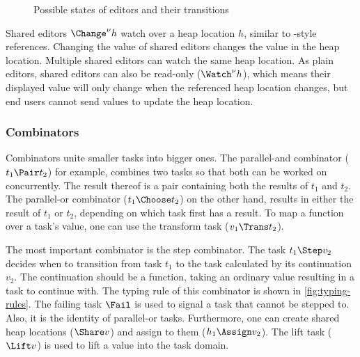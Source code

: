 \begin{figure}
  
  \caption{Possible states of editors and their transitions}
  \label{fig:editor-state}
\end{figure}

Shared editors $\Change^\nu h$ watch over a heap location $h$,
similar to \ML-style references.
Changing the value of shared editors changes the value in the heap location.
Multiple shared editors can watch the same heap location.
As plain editors, shared editors can also be read-only ($\Watch^\nu h$),
which means their displayed value will only change when the referenced heap location changes,
but end users cannot send values to update the heap location.


\subsubsection{Combinators}

Combinators unite smaller tasks into bigger ones.
The parallel-and combinator ($t_1 \Pair t_2$) for example,
combines two tasks so that both can be worked on concurrently.
The result thereof is a pair containing both the results of $t_1$ and $t_2$.
The parallel-or combinator ($t_1 \Choose t_2$) on the other hand,
results in either the result of $t_1$ or $t_2$,
depending on which task first has a result.
To map a function over a task's value,
one can use the transform task ($v_1 \Trans t_2$).

The most important combinator is the step combinator.
The task $t_1 \Step v_2$ decides when to transition from task $t_1$
to the task calculated by its continuation $v_2$.
The continuation should be a function, taking an ordinary value resulting in a task to continue with.
The typing rule of this combinator is shown in \cref{fig:typing-rules}.
The failing task $\Fail$ is used to signal a task that cannot be stepped to.
Also, it is the identity of parallel-or tasks.
Furthermore, one can create shared heap locations ($\Share v$) and assign to them ($h_1 \Assign v_2$).
The lift task ($\Lift v$) is used to lift a value into the task domain.

